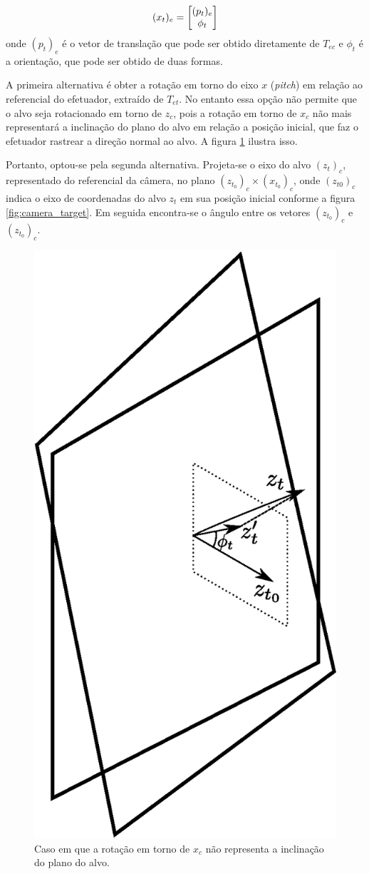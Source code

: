 \begin{equation}
({x}_t)_e = \begin{bmatrix} ({p}_t)_e \\ \phi_t \end{bmatrix}
\end{equation}
onde $({p}_t)_e$ é o vetor de translação que pode ser obtido diretamente de ${T}_{ec}$ e  $\phi_t$ é a orientação, que pode ser obtido de duas formas.


A primeira alternativa é obter a rotação em torno do eixo $x$ (\textit{pitch}) em relação ao referencial do efetuador, extraído de ${T}_{et}$. No entanto essa opção não permite que o alvo seja rotacionado em torno de ${z}_c$, pois a rotação em torno de ${x}_c$ não mais representará a inclinação do plano do alvo em relação a posição inicial, que faz o efetuador rastrear a direção normal ao alvo. A figura \ref{fig:projection} ilustra isso. 

Portanto, optou-se pela segunda alternativa. Projeta-se o eixo do alvo $({z}_t)_c$, representado do referencial da câmera, no plano $({z}_{t_0})_c \times ({x}_{t_0})_c$, onde $({z}_{t0})_c$ indica o eixo de coordenadas do alvo $z_t$ em sua posição inicial conforme a figura \ref{fig:camera_target}. Em seguida encontra-se o ângulo entre os vetores $({z}_{t_0})_c$ e $({z}_{t_0})_c$. 

\begin{figure}[!ht]
\centering
  \includegraphics[width=0.3\linewidth]{./img/projection.eps}
  \caption{Caso em que a rotação em torno de ${x}_c$ não representa a inclinação do plano do alvo.}
  \label{fig:projection}
\end{figure}%



